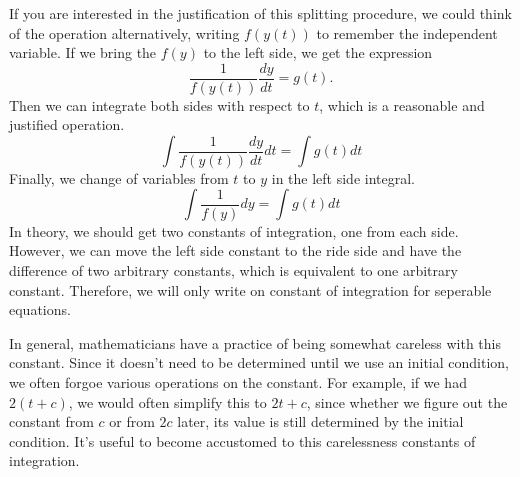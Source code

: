 \documentclass[fleqn,letterpaper]{report}
\begin{document}
If you are interested in the justification of this splitting
procedure, we could think of the operation alternatively,
writing $f(y(t))$ to remember the independent variable. If
we bring the $f(y)$ to the left side, we get the expression
\begin{equation*}
\frac{1}{f(y(t))} \frac{dy}{dt} = g(t).
\end{equation*}
Then we can integrate both sides with respect to $t$, which is
a reasonable and justified operation.
\begin{equation*}
\int \frac{1}{f(y(t))} \frac{dy}{dt} dt = \int g(t) dt
\end{equation*}
Finally, we change of variables from $t$ to $y$ in the left
side integral. 
\begin{equation*}
\int \frac{1}{f(y)} dy = \int g(t) dt
\end{equation*}
In theory, we should get two constants of integration, one
from each side. However, we can move the left side constant to
the ride side and have the difference of two arbitrary
constants, which is equivalent to one arbitrary constant.
Therefore, we will only write on constant of integration for
seperable equations. 

In general, mathematicians have a practice of being somewhat
careless with this constant. Since it doesn't need to be
determined until we use an initial condition, we often forgoe
various operations on the constant. For example, if we had
$2(t+c)$, we would often simplify this to $2t+c$, since
whether we figure out the constant from $c$ or from $2c$
later, its value is still determined by the initial condition.
It's useful to become accustomed to this carelessness
constants of integration.
\end{document}
